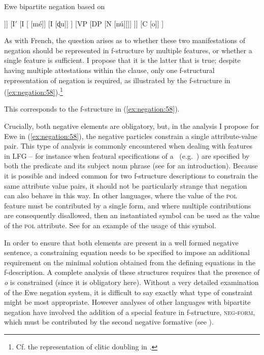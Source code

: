 \documentclass[output=paper,hidelinks]{langscibook}
\begin{document}
\ea \label{ex:negation:53} {Ewe bipartite negation based on \citet [293]{Collins:et:al:18}}
\begin{forest} 
  [CP
    [IP 
        	[DP
	   [N [Kofi]]]
	[I$'$ 
	   [I
	   	[{}  [mé]]
		[I  [ɖu]]
	   ]
	   [VP   
	   	   [DP
	     		[N [nú]]]]
	   ]]
      [C [\phantom{xxxxx}o\phantom{xxxxx}]]	   
	   ]
\end{forest}
\z

As with French, the question arises as to whether these two manifestations of negation should be represented in f-structure by multiple features, or whether a single feature is sufficient. I propose that it is the latter that is true; despite having multiple attestations within the clause, only one f-structural representation of negation is required, as illustrated by the f\nobreakdashes-structure in (\ref{ex:negation:58}).\footnote{Cf. the representation of clitic doubling in \citet [79--81]{dalrymple01}.} 

This corresponds to the f-structure in (\ref{ex:negation:58}). 

\ea \label{ex:negation:58} 
\z   
Crucially, both negative elements are obligatory, but, in the analysis I propose for Ewe in (\ref{ex:negation:58}), the negative particles constrain a single attribute-value pair. This type of analysis is commonly encountered when dealing with features in LFG -- for instance when featural specifications of a \GF\ (e.g.\ \SUBJ) are specified by both the predicate and its subject noun phrase (see \citealt[100--104]{dalrymple01} for an introduction). Because it is possible and indeed common for two f-structure descriptions to constrain the same attribute value pairs, it should not be particularly strange that negation can also behave in this way.  In other languages, where the value of the \textsc{pol} feature must be contributed by a single form, and where multiple contributions are consequently disallowed, then an instantiated symbol can be used as the value of the \textsc{pol} attribute. See  for an example of the usage of this symbol.

In order to ensure that both elements are present in a well formed negative sentence, a constraining equation needs to be specified to impose an additional requirement on the minimal solution obtained from the defining equations in the f-description. A complete analysis of these structures requires that the presence of \emph{o} is constrained (since it is obligatory here). Without a very detailed examination of the Ewe negation system, it is difficult to say exactly what type of constraint might be most appropriate. However analyses of other languages with bipartite negation have involved the addition of a special feature in f-structure, \textsc{neg-form}, which must be contributed by the second negative formative (see ).
\end{document}
